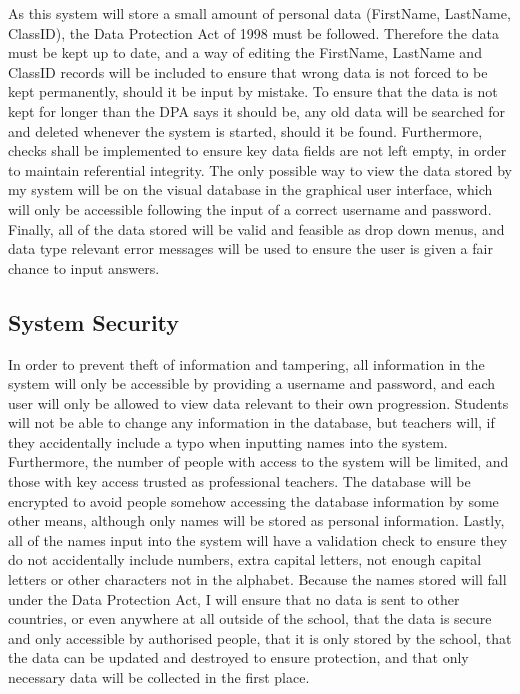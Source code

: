 As this system will store a small amount of personal data (FirstName, LastName, ClassID), the Data Protection Act of 1998 must be followed. Therefore the data must be kept up to date, and a way of editing the FirstName, LastName and ClassID records will be included to ensure that wrong data is not forced to be kept permanently, should it be input by mistake. To ensure that the data is not kept for longer than the DPA says it should be, any old data will be searched for and deleted whenever the system is started, should it be found. Furthermore, checks shall be implemented to ensure key data fields are not left empty, in order to maintain referential integrity. The only possible way to view the data stored by my system will be on the visual database in the graphical user interface, which will only be accessible following the input of a correct username and password. Finally, all of the data stored will be valid and feasible as drop down menus, and data type relevant error messages will be used to ensure the user is given a fair chance to input answers.

\subsection{System Security}

In order to prevent theft of information and tampering, all information in the system will only be accessible by providing a username and password, and each user will only be allowed to view data relevant to their own progression. Students will not be able to change any information in the database, but teachers will, if they accidentally include a typo when inputting names into the system. Furthermore, the number of people with access to the system will be limited, and those with key access trusted as professional teachers. The database will be encrypted to avoid people somehow accessing the database information by some other means, although only names will be stored as personal information. Lastly, all of the names input into the system will have a validation check to ensure they do not accidentally include numbers, extra capital letters, not enough capital letters or other characters not in the alphabet. Because the names stored will fall under the Data Protection Act, I will ensure that no data is sent to other countries, or even anywhere at all outside of the school, that the data is secure and only accessible by authorised people, that it is only stored by the school, that the data can be updated and destroyed to ensure protection, and that only necessary data will be collected in the first place.

